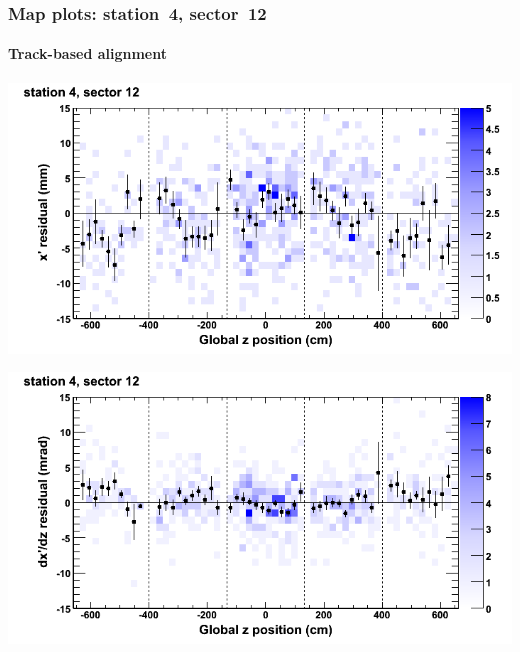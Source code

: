 \documentclass[compress]{beamer}
\begin{document}
\begin{frame}
\frametitle{Map plots: station~4, sector~12}
\framesubtitle{Track-based alignment}
\includegraphics[width=0.5\linewidth]{mapplots_re05/DTvsz_st4sec12_x.png}

\includegraphics[width=0.5\linewidth]{mapplots_re05/DTvsz_st4sec12_dxdz.png}
\end{frame}
\end{document}
